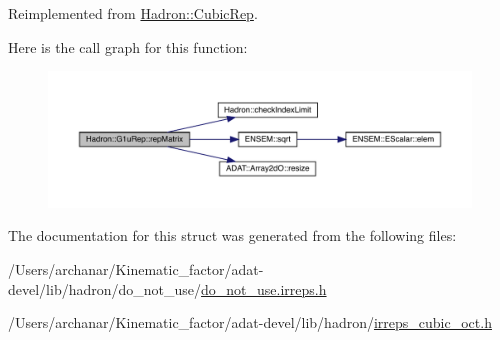 Reimplemented from \mbox{\hyperlink{structHadron_1_1CubicRep_ac5d7e9e6f4ab1158b5fce3e4ad9e8005}{Hadron\+::\+Cubic\+Rep}}.

Here is the call graph for this function\+:
\nopagebreak
\begin{figure}[H]
\begin{center}
\leavevmode
\includegraphics[width=350pt]{d8/d42/structHadron_1_1G1uRep_a0f295ec0cd03014d647fa952f2c67676_cgraph}
\end{center}
\end{figure}


The documentation for this struct was generated from the following files\+:\begin{DoxyCompactItemize}
\item 
/\+Users/archanar/\+Kinematic\+\_\+factor/adat-\/devel/lib/hadron/do\+\_\+not\+\_\+use/\mbox{\hyperlink{adat-devel_2lib_2hadron_2do__not__use_2do__not__use_8irreps_8h}{do\+\_\+not\+\_\+use.\+irreps.\+h}}\item 
/\+Users/archanar/\+Kinematic\+\_\+factor/adat-\/devel/lib/hadron/\mbox{\hyperlink{adat-devel_2lib_2hadron_2irreps__cubic__oct_8h}{irreps\+\_\+cubic\+\_\+oct.\+h}}\end{DoxyCompactItemize}
